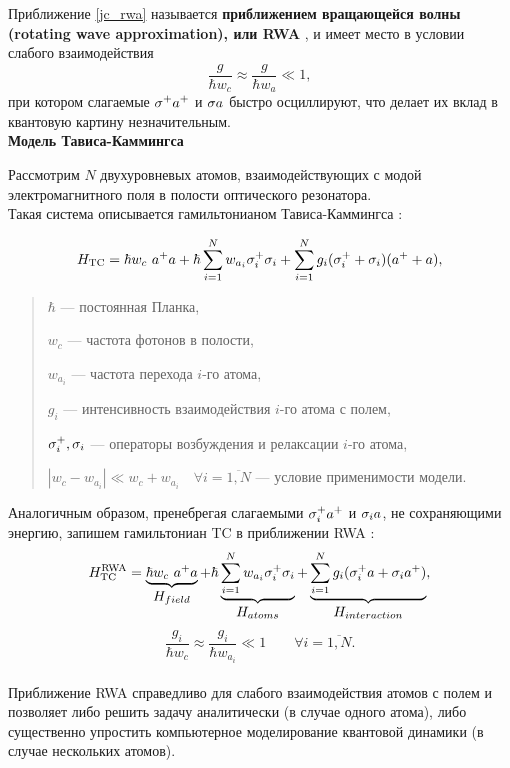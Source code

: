 \noindent Приближение \eqref{jc_rwa} называется \textbf{приближением вращающейся волны (rotating wave approximation), или RWA} \cite{ozhigov_qq,rwa_rabi_1,rwa_rabi_2}, и имеет место в условии слабого взаимодействия
\begin{equation}
	\frac{g}{\hbar w_{c}}\approx\frac{g}{\hbar w_{a}}\ll1,
\end{equation}
при котором слагаемые $\displaystyle{\sigma^{+}a^{+}}$ и $\displaystyle{\sigma a}$ быстро осциллируют, что делает их вклад в квантовую картину незначительным.
\\[28pt]
\indent\textbf{Модель Тависа-Каммингса}

Рассмотрим $N$ двухуровневых атомов, взаимодействующих с модой электромагнитного поля в полости оптического резонатора. 
\\[12pt]
\indent Такая система описывается гамильтонианом Тависа-Каммингса \cite{tc_exact_solution,tc_a_study,tc_dicke_2,tc_improvement,tc_experimental}:
\begin{normalsize}
	\begin{equation}
		H_{\text{TC}} =  \hbar w_{c}\ a^{+}a + \hbar \sum_{i=1}^N{w_{a_{i}}\sigma_{i}^{+}\sigma_{i}} + \sum_{i=1}^N{g_{i}(\sigma_{i}^{+}+\sigma_{i})(a^{+}+a)},
	\end{equation}
\end{normalsize}

\begin{quote}
	$\hbar $ --- постоянная Планка,
	
	$w_{c}$ --- частота фотонов в полости,
	
	$w_{a_{i}}$ --- частота перехода $i$-го атома,
	
	$g_{i}$ --- интенсивность взаимодействия $i$-го атома с полем,
	
	$\sigma_{i}^{+}, \sigma_{i}$ --- операторы возбуждения и релаксации $i$-го атома,
	
	$|w_{c}-w_{a_{i}}|\ll w_{c}+w_{a_{i}} \quad\forall i = \overline{1,N}$ --- условие применимости модели.
\end{quote}

\indent Аналогичным образом, пренебрегая слагаемыми $\displaystyle{\sigma_{i}^{+}a^{+}}$ и $\displaystyle{\sigma_{i} a}$, не сохраняющими энергию, запишем гамильтониан TC в приближении RWA \cite{ozhigov_qq,rwa_rabi_1,rwa_rabi_2}:
\begin{equation}
	H_{\text{TC}}^{\text{RWA}} = \underbrace{\hbar w_{c}\ a^{+}a}_{\textstyle H_{field}} + \hbar\underbrace{\sum_{i=1}^N{w_{a_{i}}\sigma_{i}^+\sigma_{i}}}_{\textstyle H_{atoms}} + \underbrace{\sum_{i=1}^N{g_{i}(\sigma_{i}^{+}a+\sigma_{i}a^{+})}}_{\textstyle H_{interaction}},
\end{equation}
\begin{equation}
	\frac{g_{i}}{\hbar w_{c}}\approx\frac{g_{i}}{\hbar w_{a_{i}}}\ll1 \qquad \forall i = \overline{1,N}.
\end{equation}
\vspace{-1em}
\
\\[0pt]
\indent Приближение RWA \cite{ozhigov_qq,rwa_rabi_1,rwa_rabi_2} справедливо для слабого взаимодействия атомов с полем и позволяет либо решить задачу аналитически (в случае одного атома), либо существенно упростить компьютерное моделирование квантовой динамики (в случае нескольких атомов). 

